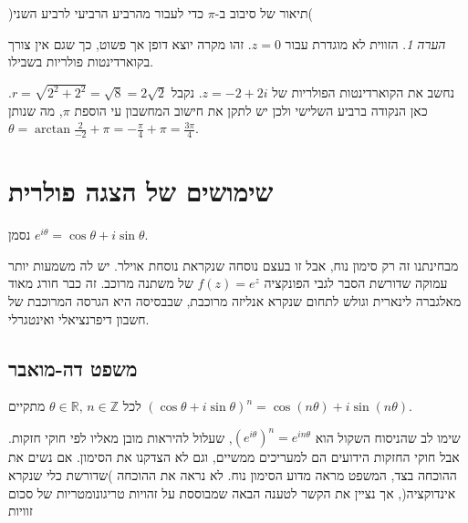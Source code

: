 \documentclass[
  hebrew,
  12pt,
  a4paper,
  oneside]{book}
\theoremstyle{definition}
\theoremstyle{remark}
\theoremstyle{plain}
\theoremstyle{remark}
\newtheorem*{remark}{הערה}
\begin{document}
)תיאור של סיבוב ב-\(\pi\) כדי לעבור מהרביע הרביעי לרביע השני(

\begin{remark}
הזווית לא מוגדרת עבור \(z=0\). זהו מקרה יוצא דופן אך פשוט, כך שגם אין
צורך בקוארדינטות פולריות בשבילו.
\end{remark}

\begin{example}

נחשב את הקוארדינטות הפולריות של \(z=-2+2i\). נקבל
\(r=\sqrt{2^{2}+2^{2}}=\sqrt{8}=2\sqrt{2}\). כאן הנקודה ברביע השלישי
ולכן יש לתקן את חישוב המחשבון עי הוספת \(\pi\), מה שנותן
\(\theta=\arctan\frac{2}{-2}+\pi=-\frac{\pi}{4}+\pi=\frac{3\pi}{4}\).

\end{example}

\section{שימושים של הצגה
פולרית}\label{ux5e9ux5d9ux5deux5d5ux5e9ux5d9ux5dd-ux5e9ux5dc-ux5d4ux5e6ux5d2ux5d4-ux5e4ux5d5ux5dcux5e8ux5d9ux5ea}

\begin{definition}

נסמן \(e^{i\theta}=\cos\theta+i\sin\theta\).

\end{definition}

מבחינתנו זה רק סימון נוח, אבל זו בעצם נוסחה שנקראת נוסחת אוילר. יש לה
משמעות יותר עמוקה שדורשת הסבר לגבי הפונקציה \(f(z)=e^{z}\) של משתנה
מרוכב. זה כבר חורג מאוד מאלגברה לינארית וגולש לתחום שנקרא אנליזה מרוכבת,
שבבסיסה היא הגרסה המרוכבת של חשבון דיפרנציאלי ואינטגרלי.

\subsection{משפט
דה-מואבר}\label{ux5deux5e9ux5e4ux5d8-ux5d3ux5d4-ux5deux5d5ux5d0ux5d1ux5e8}

\begin{theorem}

לכל \(\theta\in\mathbb{R},\,n\in\mathbb{Z}\) מתקיים
\((\cos\theta+i\sin\theta)^{n}=\cos(n\theta)+i\sin(n\theta)\).

\end{theorem}

שימו לב שהניסוח השקול הוא \((e^{i\theta})^{n}=e^{in\theta}\), שעלול
להיראות מובן מאליו לפי חוקי חזקות. אבל חוקי החזקות הידועים הם למעריכים
ממשיים, וגם לא הצדקנו את הסימון. אם נשים את ההוכחה בצד, המשפט מראה מדוע
הסימון נוח. לא נראה את ההוכחה )שדורשת כלי שנקרא אינדוקציה(, אך נציין את
הקשר לטענה הבאה שמבוססת על זהויות טריגונומטריות של סכום זוויות
\end{document}
